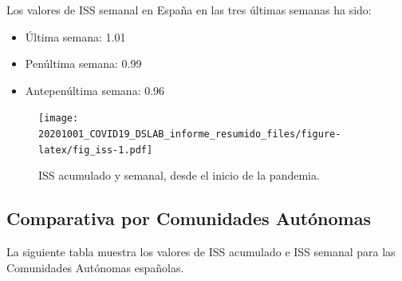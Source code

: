 \documentclass[
  11pt,
]{article}
\providecommand{\tightlist}{%
  \setlength{\itemsep}{0pt}\setlength{\parskip}{0pt}}
\begin{document}
Los valores de ISS semanal en España en las tres últimas semanas ha
sido:

\begin{itemize}
\tightlist
\item
  Última semana: 1.01
\item
  Penúltima semana: 0.99
\item
  Antepenúltima semana: 0.96
\end{itemize}

\vspace{0.2cm}

\begin{figure}
\centering
\texttt{[image: 20201001\_COVID19\_DSLAB\_informe\_resumido\_files/figure-latex/fig\_iss-1.pdf]}
\caption{\label{fig:fig_iss} ISS acumulado y semanal, desde el inicio de
la pandemia.}
\end{figure}

\clearpage

\hypertarget{comparativa-por-comunidades-autuxf3nomas}{%
\subsection{Comparativa por Comunidades
Autónomas}\label{comparativa-por-comunidades-autuxf3nomas}}

La siguiente tabla muestra los valores de ISS acumulado e ISS semanal
para las Comunidades Autónomas españolas. \vspace{0.2cm}
\end{document}
